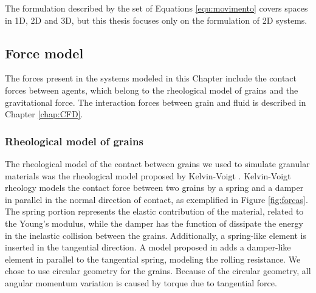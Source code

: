 
    The formulation described by the set of Equations \ref{equ:movimento} covers spaces in 1D, 2D and 3D, but this thesis focuses only on the formulation of 2D systems.

\subsection{Force model}
\label{subchap:Modelo_Forcas}

    The forces present in the systems modeled in this Chapter include the contact forces between agents, which belong to the rheological model of grains and the gravitational force. The interaction forces between grain and fluid is described in Chapter \ref{chap:CFD}.

\subsubsection{Rheological model of grains}
\label{subsubchap:Reologia}

    The rheological model of the contact between grains we used to simulate granular materials was the rheological model proposed by Kelvin-Voigt \cite{Kelvin, Voigt}. Kelvin-Voigt rheology models the contact force between two grains by a spring and a damper in parallel in the normal direction of contact, as exemplified in Figure \ref{fig:forcas}. The spring portion represents the elastic contribution of the material, related to the Young's modulus, while the damper has the function of dissipate the energy in the inelastic collision between the grains. Additionally, a spring-like element is inserted in the tangential direction. A model proposed in \cite{Caio-Tese} adds a damper-like element in parallel to the tangential spring, modeling the rolling resistance. We chose to use circular geometry for the grains. Because of the circular geometry, all angular momentum variation is caused by torque due to tangential force.

